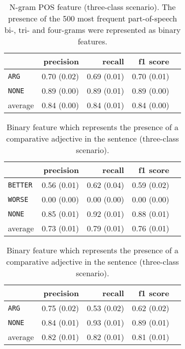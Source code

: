 	\begin{table}[h] 
		\centering 
		\caption{N-gram POS feature (three-class scenario). The presence of the 500 most frequent part-of-speech bi-, tri- and four-grams were represented as binary features.} 
		\label{  }
		\begin{tabular}{@{}lrrrr@{}}
			\toprule
			        & precision                & recall                   & f1 score                 \\ \midrule 
			\texttt{ARG}     & 0.70 \scriptsize{(0.02)} & 0.69 \scriptsize{(0.01)} & 0.70 \scriptsize{(0.01)} \\ 
			\texttt{NONE}    & 0.89 \scriptsize{(0.00)} & 0.89 \scriptsize{(0.01)} & 0.89 \scriptsize{(0.00)} \\ 
			average & 0.84 \scriptsize{(0.00)} & 0.84 \scriptsize{(0.01)} & 0.84 \scriptsize{(0.00)} \\ 
			\bottomrule
		\end{tabular}
	\end{table}
	

	

	\begin{table}[h] 
		\centering 
		\caption{Binary feature which represents the presence of a comparative adjective in the sentence (three-class scenario).} 
		\label{ }
		\begin{tabular}{@{}lrrrr@{}}
			\toprule
			        & precision                & recall                   & f1 score                 \\ \midrule 
			\texttt{BETTER}  & 0.56 \scriptsize{(0.01)} & 0.62 \scriptsize{(0.04)} & 0.59 \scriptsize{(0.02)} \\ 
			\texttt{WORSE}   & 0.00 \scriptsize{(0.00)} & 0.00 \scriptsize{(0.00)} & 0.00 \scriptsize{(0.00)} \\ 
			\texttt{NONE}    & 0.85 \scriptsize{(0.01)} & 0.92 \scriptsize{(0.01)} & 0.88 \scriptsize{(0.01)} \\ 
			average & 0.73 \scriptsize{(0.01)} & 0.79 \scriptsize{(0.01)} & 0.76 \scriptsize{(0.01)} \\ 
			\bottomrule
		\end{tabular}
	\end{table}
	
		\begin{table}[h] 
		\centering 
		\caption{ Binary feature which represents the presence of a comparative adjective in the sentence (three-class scenario). } 
		\label{  }
		\begin{tabular}{@{}lrrrr@{}}
			\toprule
			        & precision                & recall                   & f1 score                 \\ \midrule 
			\texttt{ARG}     & 0.75 \scriptsize{(0.02)} & 0.53 \scriptsize{(0.02)} & 0.62 \scriptsize{(0.02)} \\ 
			\texttt{NONE}    & 0.84 \scriptsize{(0.01)} & 0.93 \scriptsize{(0.01)} & 0.89 \scriptsize{(0.01)} \\ 
			average & 0.82 \scriptsize{(0.01)} & 0.82 \scriptsize{(0.01)} & 0.81 \scriptsize{(0.01)} \\ 
			\bottomrule
		\end{tabular}
	\end{table}
	
